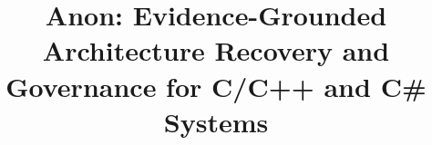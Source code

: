 \documentclass[10pt,conference]{IEEEtran}
\newif\ifanonymous
\begin{document}
\ifanonymous
  \title{Evidence-Grounded Architecture Recovery and Governance for C/C++ and C\# Systems}
\else
  \title{Anon: Evidence-Grounded Architecture Recovery and Governance for C/C++ and C\# Systems}
\fi

\ifanonymous
  \author{\IEEEauthorblockN{Anonymous Author(s)}
  \IEEEauthorblockA{Affiliation withheld for double-anonymous review}}
\else
  \author{
  }
\fi

\maketitle
\end{document}
